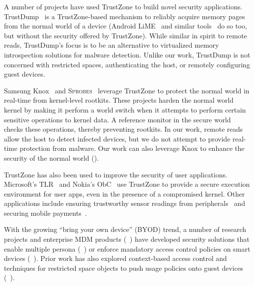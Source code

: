 \label{section:related}

%
A number of projects have used TrustZone to build novel security applications.
TrustDump~\cite{trustdump:esorics14} is a TrustZone-based mechanism to reliably
acquire memory pages from the normal world of a device (Android
LiME~\cite{lime} and similar tools~\cite{dmd,ddms,recoverymode} do so too, but
without the security offered by TrustZone).  While similar in spirit to remote
reads, TrustDump's focus is to be an alternative to virtualized memory
introspection solutions for malware detection. Unlike our work, TrustDump is
not concerned with restricted spaces, authenticating the host, or remotely
configuring guest devices.

Samsung Knox~\cite{knox:ccs14} and \textsc{Sprobes}~\cite{sprobes:most14}
leverage TrustZone to protect the normal world in real-time from kernel-level
rootkits. These projects harden the normal world kernel by making it perform a
world switch when it attempts to perform certain sensitive operations to kernel
data. A reference monitor in the secure world checks these operations, thereby
preventing rootkits. In our work, remote reads allow the host to detect
infected devices, but we do not attempt to provide real-time protection from
malware. Our work can also leverage Knox to enhance the security of the normal
world ().

TrustZone has also been used to improve the security of user applications.
Microsoft's TLR~\cite{tlr:asplos14} and Nokia's ObC~\cite{obc:asiaccs09} use
TrustZone to provide a secure execution environment for user apps, even in the
presence of a compromised kernel. Other applications include ensuring
trustworthy sensor readings from peripherals~\cite{tenor:mobisys12} and
securing mobile payments~\cite{proxama}.

 With the growing ``bring your own device''
(BYOD) trend, a number of research projects and enterprise MDM products
(\eg~\cite{knox:mdm,ms:intune,blackberry:emm}) have developed security
solutions that enable multiple persona
(\eg~\cite{asm:sec14,flaskdroid:sec13,cells:sosp11}) or enforce mandatory
access control policies on smart devices
(\eg~\cite{deepdroid:ndss15,seandroid:ndss13,flaskdroid:sec13,asm:sec14}).
Prior work has also explored context-based access control and techniques for
restricted space objects to push usage policies onto guest devices
(\eg~\cite{saint:acsac09,Covington2002,conxsense:asiaccs14,worlddriven:ccs14,blindspot:2009,markit:upside14}).

